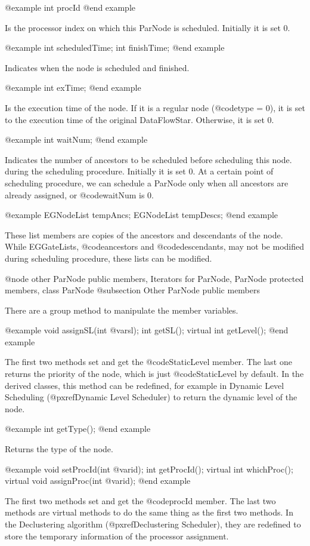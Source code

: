 @example
int procId
@end example

Is the processor index on which this ParNode is scheduled. Initially it
is set 0.

@example
int scheduledTime;
int finishTime;
@end example

Indicates when the node is scheduled and finished. 

@example
int exTime;
@end example

Is the execution time of the node. If it is a regular node (@code{type} = 0),
it is set to the execution time of the original DataFlowStar. Otherwise,
it is set 0.

@example
int waitNum;
@end example

Indicates the number of ancestors to be scheduled before scheduling this node.
during the scheduling procedure. Initially it is set 0. 
At a certain point of scheduling procedure,
we can schedule a ParNode only when all ancestors are already assigned, or
@code{waitNum} is 0.

@example
EGNodeList tempAncs;
EGNodeList tempDescs;
@end example

These list members are copies of the ancestors and descendants of the node.
While EGGateLists, @code{ancestors} and @code{descendants}, may not
be modified during scheduling procedure, these lists can be modified.

@node other ParNode public members, Iterators for ParNode, ParNode protected members, class ParNode
@subsection Other ParNode public members

There are a group method to manipulate the member variables.

@example
void assignSL(int @var{sl});
int getSL();
virtual int getLevel();
@end example

The first two methods set and get the @code{StaticLevel} member.
The last one returns the priority of the node, which is just
@code{StaticLevel} by default. In the derived classes, this method
can be redefined, for example in Dynamic Level Scheduling
(@pxref{Dynamic Level Scheduler}) to return the dynamic level of the node.

@example
int getType();
@end example

Returns the type of the node.

@example
void setProcId(int @var{id});
int getProcId();
virtual int whichProc();
virtual void assignProc(int @var{id});
@end example

The first two methods set and get the @code{procId} member. The last
two methods are virtual methods to do the same thing as the first two
methods. In the Declustering algorithm (@pxref{Declustering Scheduler}),
they are redefined to store the temporary information of the processor
assignment.

